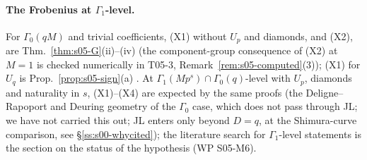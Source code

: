 \paragraph{The Frobenius at $\Gamma_1$-level.}
\begin{remark}\label{rem:s05-Xstatus}
For $\Gamma_0(qM)$ and trivial coefficients, (X1) without $U_p$ and diamonds, and (X2), are Thm.~\ref{thm:s05-G}(ii)--(iv) \stcited{}
(the component-group consequence of (X2) at $M=1$ is checked numerically in T05-3, Remark~\ref{rem:s05-computed}(3));
(X1) for $U_q$ is Prop.~\ref{prop:s05-sign}(a) \stpmc. At $\Gamma_1(Mp^s)\cap\Gamma_0(q)$-level with $U_p$, diamonds and naturality in $s$,
(X1)--(X4) are expected by the same proofs \stexp{} (the Deligne--Rapoport and Deuring geometry of the $\Gamma_0$ case, which does not
pass through JL; we have not carried this out; JL enters only beyond $D=q$, at the Shimura-curve comparison, see \S\ref{ss:s00-whycited}); the literature search for $\Gamma_1$-level statements is the section on the
status of the hypothesis (WP S05-M6).


\end{remark}

